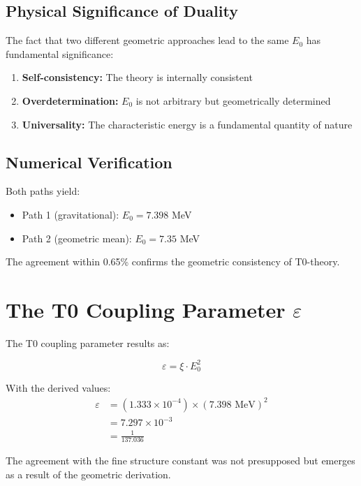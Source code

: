 \documentclass[12pt,a4paper]{article}
\begin{document}
	\subsection{Physical Significance of Duality}
	
	The fact that two different geometric approaches lead to the same $E_0$ has fundamental significance:
	
	\begin{enumerate}
		\item \textbf{Self-consistency:} The theory is internally consistent
		\item \textbf{Overdetermination:} $E_0$ is not arbitrary but geometrically determined
		\item \textbf{Universality:} The characteristic energy is a fundamental quantity of nature
	\end{enumerate}
	
	\subsection{Numerical Verification}
	
	Both paths yield:
	\begin{itemize}
		\item Path 1 (gravitational): $E_0 = 7.398$ MeV
		\item Path 2 (geometric mean): $E_0 = 7.35$ MeV
	\end{itemize}
	
	The agreement within 0.65\% confirms the geometric consistency of T0-theory.
	
	\section{The T0 Coupling Parameter $\varepsilon$}
	
	The T0 coupling parameter results as:
	
	\begin{equation}
		\varepsilon = \xi \cdot E_0^2
	\end{equation}
	
	With the derived values:
	\begin{align}
		\varepsilon &= (1.333 \times 10^{-4}) \times (7.398 \text{ MeV})^2\\
		&= 7.297 \times 10^{-3}\\
		&= \frac{1}{137.036}
	\end{align}
	
	The agreement with the fine structure constant was not presupposed but emerges as a result of the geometric derivation.
	
\end{document}
